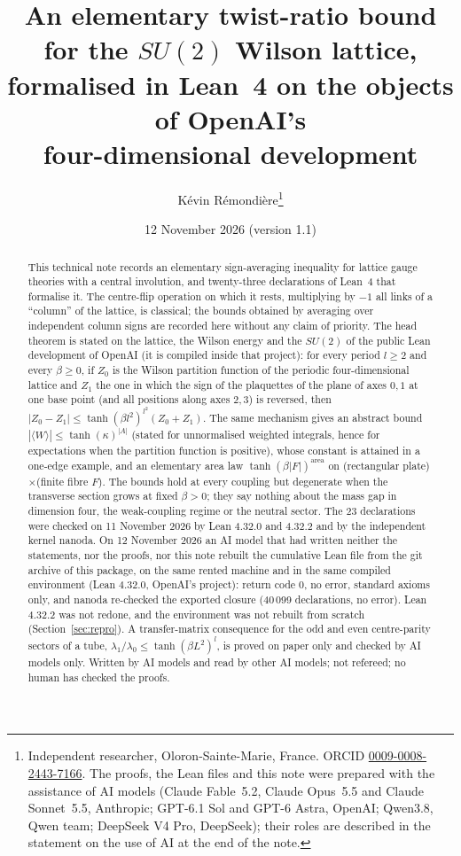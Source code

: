 \documentclass[11pt,a4paper]{article}
\title{An elementary twist-ratio bound for the $SU(2)$ Wilson lattice,\\ formalised in Lean~4 on the objects of OpenAI's\\ four-dimensional development}
\author{K\'evin R\'emondi\`ere\thanks{Independent researcher, Oloron-Sainte-Marie, France. ORCID
\href{https://orcid.org/0009-0008-2443-7166}{0009-0008-2443-7166}. The proofs, the Lean files and this note were
prepared with the assistance of AI models (Claude Fable~5.2, Claude Opus~5.5 and Claude Sonnet~5.5, Anthropic; GPT-6.1 Sol and GPT-6 Astra, OpenAI; Qwen3.8, Qwen team; DeepSeek V4 Pro, DeepSeek); their roles are described in the
statement on the use of AI at the end of the note.}}
\date{12 November 2026 (version 1.1)}
\theoremstyle{plain}
\theoremstyle{definition}
\theoremstyle{remark}
\numberwithin{equation}{section}
\begin{document}
\maketitle

\begin{abstract}
This technical note records an elementary sign-averaging inequality for lattice gauge theories with a central involution, and twenty-three declarations of Lean~4 that formalise it. The centre-flip operation on which it rests, multiplying by $-1$ all links of a ``column'' of the lattice, is classical; the bounds obtained by averaging over independent column signs are recorded here without any claim of priority. The head theorem is stated on the lattice, the Wilson energy and the $SU(2)$ of the public Lean development of OpenAI (it is compiled inside that project): for every period $l\ge2$ and every $\beta\ge0$, if $Z_0$ is the Wilson partition function of the periodic four-dimensional lattice and $Z_1$ the one in which the sign of the plaquettes of the plane of axes $0,1$ at one base point (and all positions along axes $2,3$) is reversed, then $|Z_0-Z_1|\le\tanh(\beta l^2)^{l^2}(Z_0+Z_1)$. The same mechanism gives an abstract bound $|\langle W\rangle|\le\tanh(\kappa)^{|A|}$ (stated for unnormalised weighted integrals, hence for expectations when the partition function is positive), whose constant is attained in a one-edge example, and an elementary area law $\tanh(\beta|F|)^{\mathrm{area}}$ on (rectangular plate)$\times$(finite fibre $F$). The bounds hold at every coupling but degenerate when the transverse section grows at fixed $\beta>0$; they say nothing about the mass gap in dimension four, the weak-coupling regime or the neutral sector. The 23 declarations were checked on 11 November 2026 by Lean 4.32.0 and 4.32.2 and by the independent kernel nanoda. On 12 November 2026 an AI model that had written neither the statements, nor the proofs, nor this note rebuilt the cumulative Lean file from the git archive of this package, on the same rented machine and in the same compiled environment (Lean 4.32.0, OpenAI's project): return code 0, no error, standard axioms only, and nanoda re-checked the exported closure (40\,099 declarations, no error). Lean 4.32.2 was not redone, and the environment was not rebuilt from scratch (Section~\ref{sec:repro}). A transfer-matrix consequence for the odd and even centre-parity sectors of a tube, $\lambda_1/\lambda_0\le\tanh(\beta L^2)^l$, is proved on paper only and checked by AI models only. Written by AI models and read by other AI models; not refereed; no human has checked the proofs.


\end{abstract}
\end{document}
